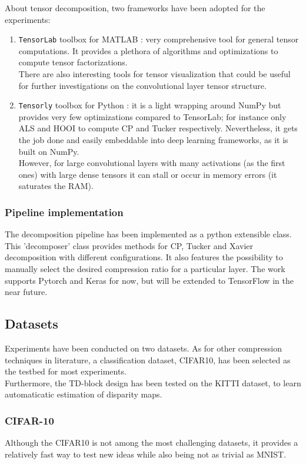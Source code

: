 About tensor decomposition, two frameworks have been adopted for the experiments: 
\begin{enumerate}
    \item \texttt{TensorLab} toolbox for MATLAB \parencite{WT	nsorlab}: very comprehensive tool for general tensor computations. It provides a plethora of algorithms and optimizations to compute tensor factorizations. \\ 
    There are also interesting tools for tensor visualization that could be useful for further investigations on the convolutional layer tensor structure. 
    
    \item \texttt{Tensorly} toolbox for Python \parencite{Wtensorly}: it is a light wrapping around NumPy but provides very few optimizations compared to TensorLab; for instance only ALS and HOOI to compute CP and Tucker respectively. Nevertheless, it gets the job done and easily embeddable into deep learning frameworks, as it is built on NumPy. \\
    However, for large convolutional layers with many activations (as the first ones) with large dense tensors it can stall or occur in memory errors (it saturates the RAM). 
\end{enumerate}

\subsubsection{Pipeline implementation}
The decomposition pipeline has been implemented as a python extensible class. This 'decomposer' class provides methods for CP, Tucker and Xavier decomposition with different configurations. It also features the possibility to manually select the desired compression ratio for a particular layer. The work supports Pytorch and Keras for now, but will be extended to TensorFlow in the near future.  

\subsection{Datasets}
Experiments have been conducted on two datasets. As for other compression techniques in literature, a classification dataset, CIFAR10, has been selected as the testbed for most experiments. \\
Furthermore, the TD-block design has been tested on the KITTI dataset, to learn automaticatic estimation of disparity maps. 


\subsubsection{CIFAR-10}
Although the CIFAR10 is not among the most challenging datasets, it provides a relatively fast way to test new ideas while also being not as trivial as MNIST. 


